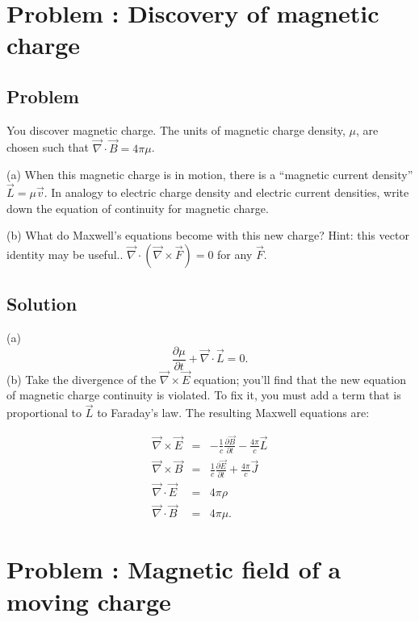 \documentclass[solutions]{esg8022pset}
\date{\today }
\begin{document}
\section{Problem \thesection: Discovery of magnetic charge}
\subsection{Problem}
You discover magnetic
charge.  The units of magnetic charge density,
$\mu$, are chosen such that $\vec\nabla\cdot\vec B = 4\pi\mu$.

\par\noindent (a) When this magnetic charge is in motion,
there is a ``magnetic current density'' $\vec {L} = \mu \vec{ v}$.  In
analogy to electric charge density and electric current densities,
write down the equation of continuity for magnetic charge.

\par\noindent (b) What do Maxwell's equations become with this
new charge? Hint: this vector identity may be useful.. $\vec\nabla\cdot(\vec{\nabla}\times\vec{F})=0$ for any $\vec{F}$.
\subsection{Solution}
(a) \begin{equation}
\frac{\partial \mu}{\partial t}+\vec{\nabla}\cdot\vec{L}=0.
\end{equation}
(b) Take the divergence of the $\vec\nabla\times\vec E$ equation; you'll
find that the new equation of magnetic charge continuity is violated.
To fix it, you must add a term that is proportional to $\vec L$ to
Faraday's law.  The resulting Maxwell equations are:

\begin{eqnarray}
\vec{\nabla}\times\vec{E} &=& -\frac{1}{c}\frac{\partial
\vec{B}}{\partial t}-\frac{4\pi}{c}\vec{L}\\
\vec{\nabla}\times\vec{B} &=& \frac{1}{c}\frac{\partial
\vec{E}}{\partial t}+\frac{4\pi}{c}\vec{J}\\
\vec{\nabla}\cdot\vec{E} &=& 4\pi\rho\\
\vec{\nabla}\cdot\vec{B} &=& 4\pi\mu.
\end{eqnarray}




\section{Problem \thesection:  Magnetic field of a moving charge}
\end{document}
